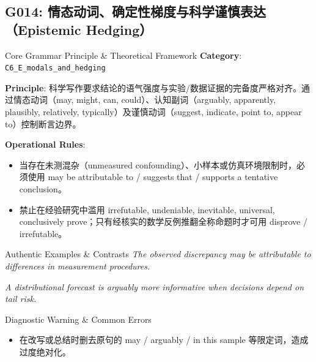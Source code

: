 \subsection{G014: 情态动词、确定性梯度与科学谨慎表达（Epistemic Hedging）}\label{sec:rule:G014}
\begin{ConceptBox}{Core Grammar Principle \& Theoretical Framework}
\textbf{Category}: \texttt{C6\_E\_modals\_and\_hedging}\par\vspace{3pt}
\textbf{Principle}: 科学写作要求结论的语气强度与实验/数据证据的完备度严格对齐。通过情态动词（may, might, can, could）、认知副词（arguably, apparently, plausibly, relatively, typically）及谨慎动词（suggest, indicate, point to, appear to）控制断言边界。\par\vspace{4pt}
\textbf{Operational Rules}:
\begin{itemize}[leftmargin=1.5em, itemsep=1pt]
  \item 当存在未测混杂（unmeasured confounding）、小样本或仿真环境限制时，必须使用 may be attributable to / suggests that / supports a tentative conclusion。
  \item 禁止在经验研究中滥用 irrefutable, undeniable, inevitable, universal, conclusively prove；只有经核实的数学反例推翻全称命题时才可用 disprove / irrefutable。
\end{itemize}
\end{ConceptBox}
\begin{ExampleBox}{Authentic Examples \& Contrasts}
\textit{The observed discrepancy may be attributable to differences in measurement procedures.}\par\vspace{2pt}
\textit{A distributional forecast is arguably more informative when decisions depend on tail risk.}\par\vspace{2pt}
\end{ExampleBox}
\begin{TipBox}{Diagnostic Warning \& Common Errors}
\begin{itemize}[leftmargin=1.5em, itemsep=1pt]
  \item 在改写或总结时删去原句的 may / arguably / in this sample 等限定词，造成过度绝对化。
\end{itemize}
\end{TipBox}
\vspace{6pt}
